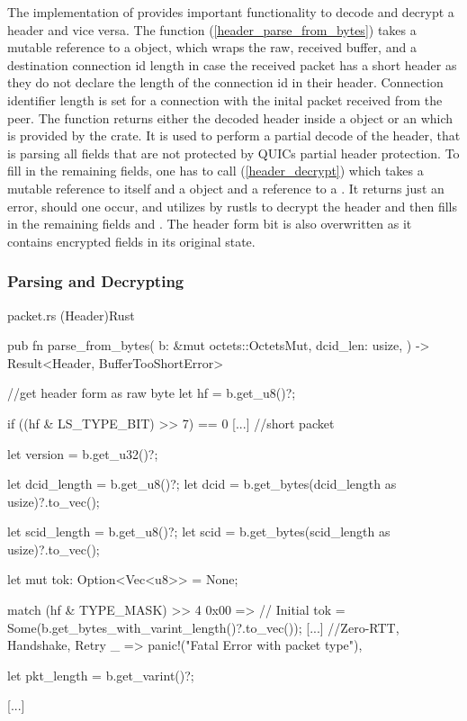The implementation of  provides important functionality to decode and decrypt a header and vice versa. The function
(\ref{header_parse_from_bytes}) takes a mutable reference to a  object, which wraps the raw,
received buffer, and
a destination connection id length in case the received packet has a short header as they do not declare the length of the connection
id in their header. Connection identifier length is set for a connection with the inital packet received from the peer. 
The function returns either the decoded header inside a  object or an  which
is provided by the  crate. It is used to perform a partial decode of the header, that is parsing all fields that are not protected
by QUICs partial
header protection. To fill in the remaining fields, one has to call (\ref{header_decrypt}) which takes a mutable reference to
itself and a  object and a reference to a . It returns just an error, should one occur, and utilizes
 by rustls to decrypt the header and then fills in the remaining fields  and
. The header form bit is also overwritten as it contains encrypted fields in its original state.

\subsubsection{Parsing and Decrypting}

\begin{codeblock}{packet.rs (Header)}{Rust}
    \begin{rustcode}
        pub fn parse_from_bytes(
            b: &mut octets::OctetsMut,
            dcid_len: usize,
        ) -> Result<Header, BufferTooShortError> {
            //get header form as raw byte
            let hf = b.get_u8()?;

            if ((hf & LS_TYPE_BIT) >> 7) == 0 {
                [...] //short packet
            }

            let version = b.get_u32()?;

            let dcid_length = b.get_u8()?;
            let dcid = b.get_bytes(dcid_length as usize)?.to_vec();

            let scid_length = b.get_u8()?;
            let scid = b.get_bytes(scid_length as usize)?.to_vec();

            let mut tok: Option<Vec<u8>> = None;

            match (hf & TYPE_MASK) >> 4 {
                0x00 => {
                    // Initial
                    tok = Some(b.get_bytes_with_varint_length()?.to_vec());
                }
                [...] //Zero-RTT, Handshake, Retry
                _ => panic!("Fatal Error with packet type"),
            }

            let pkt_length = b.get_varint()?;

            [...]
        }
    \end{rustcode}
    \label{header_parse_from_bytes}
\end{codeblock}

